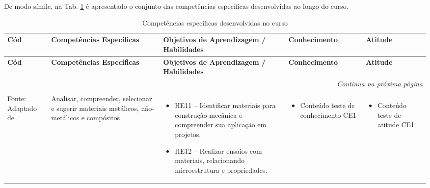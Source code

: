 De modo símile, na Tab. \ref{tab:competencias_especificas}  é apresentado o conjunto das competências específicas desenvolvidas ao longo do curso.
\begin{landscape}
	
	\scriptsize
	\setlength{\tabcolsep}{4pt}
	
	\begin{longtable}{m{1.2cm} m{5cm} m{8.2cm} m{5.2cm} m{5.2cm}}
		\caption{Competências específicas desenvolvidas no curso}
		\label{tab:competencias_especificas} \\
		\hline
		\textbf{Cód} & \textbf{Competências Específicas} & \textbf{Objetivos de Aprendizagem / Habilidades} & \textbf{Conhecimento} & \textbf{Atitude} \\
		\hline
		\endfirsthead
		
		\hline
		\textbf{Cód} & \textbf{Competências Específicas} & \textbf{Objetivos de Aprendizagem / Habilidades} & \textbf{Conhecimento} & \textbf{Atitude} \\
		\hline
		\endhead
		
		\multicolumn{5}{r}{\textit{Continua na próxima página}} \\
		\endfoot
		
		\hline
		\caption*{\\Fonte: \normalfont Adaptado de \citeonline{res259}}
		\endlastfoot
		
		
		
		\multirow{2}{*}{CE1} &
		\multirow{2}{5cm}{Analisar, compreender, selecionar e sugerir materiais metálicos, não-metálicos e compósitos} &
		
		\begin{itemize}
			\item HE11 – Identificar materiais para construção mecânica e compreender sua aplicação em projetos.
			\item HE12 – Realizar ensaios com materiais, relacionando microestrutura e propriedades.
		\end{itemize}
		
		& 
		\multirow{2}{5.2cm}{\begin{itemize}
				\item Conteúdo teste de conhecimento CE1
		\end{itemize}} &
		
		\multirow{2}{5.2cm}{\begin{itemize}
				\item Conteúdo teste de atitude CE1
		\end{itemize}} \\
		

\end{longtable}
\end{landscape}
